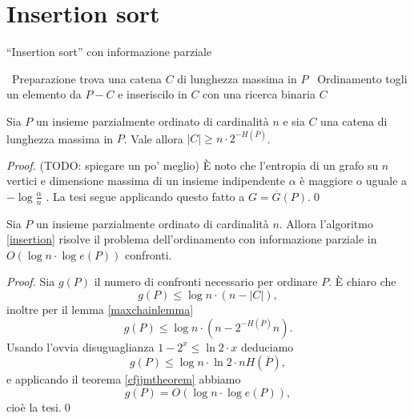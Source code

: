 {\section{Insertion sort} 
\begin{algorithm}
	\caption{``Insertion sort'' con informazione parziale} \label{insertion} 
	\begin{algorithmic}
		[1] \STATE \, \COMMENT Preparazione \STATE trova una catena \(C\) di lunghezza massima in \(P\) \STATE \, \COMMENT Ordinamento  \STATE togli un elemento da \(P-C\) e inseriscilo in \(C\) con una ricerca binaria \ENDWHILE \RETURN \(C\) 
	\end{algorithmic}
\end{algorithm}
\begin{lemma}
	\label{maxchainlemma} Sia \(P\) un insieme parzialmente ordinato di cardinalità \(n\) e sia \(C\) una catena di lunghezza massima in \(P\). Vale allora \(\left|C\right|\ge n\cdot2^{-H(\overline{P})}\). 
\end{lemma}
\begin{proof}
	(TODO: spiegare un po' meglio) È noto che l'entropia di un grafo su \(n\) vertici e dimensione massima di un insieme indipendente \(\alpha\) è maggiore o uguale a \(-\log{\frac{\alpha}{n}}\) \cite{Cardinal2005}. La tesi segue applicando questo fatto a \(G=\overline{G}(P)\).\qed 
\end{proof}
\begin{theorem}
	Sia \(P\) un insieme parzialmente ordinato di cardinalità \(n\). Allora l'algoritmo \ref{insertion} risolve il problema dell'ordinamento con informazione parziale in \(O(\log{n}\cdot\log{e(P)})\) confronti. 
\end{theorem}
\begin{proof}
	Sia \(g(P)\) il numero di confronti necessario per ordinare \(P\). È chiaro che
	\[g(P)\le \log{n}\cdot(n-|C|),\]
	inoltre per il lemma \ref{maxchainlemma}
	\[g(P)\le\log{n}\cdot(n-2^{-H(\overline{P})}n).\]
	Usando l'ovvia disuguaglianza \(1-2^{x}\le\ln{2}\cdot x\) deduciamo
	\[g(P)\le\log{n}\cdot\ln{2}\cdot nH(\overline{P}),\]
	e applicando il teorema \ref{cfjjmtheorem} abbiamo
	\[g(P)=O(\log{n}\cdot\log{e(P)}),\]
	cioè la tesi.\qed 
\end{proof}

}
